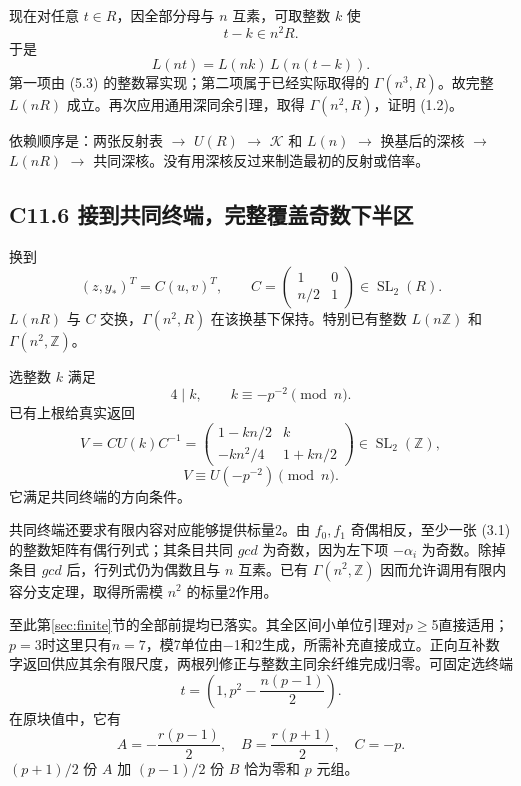 \documentclass[11pt,a4paper]{article}
\theoremstyle{definition}
\numberwithin{equation}{section}
\begin{document}
{现在对任意} \(t\in R\){，因全部分母与} \(n\) {互素，可取整数} \(k\) {使} \[
t-k\in n^2R.
\] {于是} \[
L(nt)=L(nk)\,L(n(t-k)).
\] {第一项由} {(5.3)} {的整数幂实现；第二项属于已经实际取得的} \(\Gamma(n^3,R)\){。故完整} \(L(nR)\) {成立。再次应用通用深同余引理，取得} \(\Gamma(n^2,R)\){，证明} {(1.2)。}

{依赖顺序是：两张反射表} {\ensuremath{\to}} \(U(R)\) {\ensuremath{\to}} \(\mathcal K\) {和} \(L(n)\) {\ensuremath{\to}} {换基后的深核} {\ensuremath{\to}} \(L(nR)\) {\ensuremath{\to}} {共同深核。没有用深核反过来制造最初的反射或倍率。}

\subsection*{\texorpdfstring{{C11.6} {接到共同终端，完整覆盖奇数下半区}}{C11.6 接到共同终端，完整覆盖奇数下半区}}\label{C11-h83}

{换到} \[
(z,y_*)^T=C(u,v)^T,\qquad
C=\begin{pmatrix}1&0\\n/2&1\end{pmatrix}\in\operatorname{SL}_2(R).
\] \(L(nR)\) {与} \(C\) {交换，}\(\Gamma(n^2,R)\) {在该换基下保持。特别已有整数} \(L(n\mathbb Z)\) {和} \(\Gamma(n^2,\mathbb Z)\){。}

{选整数} \(k\) {满足} \[
4\mid k,\qquad k\equiv-p^{-2}\pmod n.
\] {已有上根给真实返回} \[
V=CU(k)C^{-1}
=\begin{pmatrix}
1-kn/2&k\\-kn^2/4&1+kn/2
\end{pmatrix}\in\operatorname{SL}_2(\mathbb Z),
\] \[
V\equiv U(-p^{-2})\pmod n.
\tag{C11.6.1}
\] {它满足共同终端的方向条件。}

{共同终端还要求有限内容对应能够提供标量2。由} \(f_0,f_1\) {奇偶相反，至少一张} {(3.1)} {的整数矩阵有偶行列式；其条目共同} {\ensuremath{gcd}} {为奇数，因为左下项} \(-\alpha_i\) {为奇数。除掉条目} {\ensuremath{gcd}} {后，行列式仍为偶数且与} \(n\) {互素。已有} \(\Gamma(n^2,\mathbb Z)\) {因而允许调用有限内容分支定理，取得所需模} \(n^2\) {的标量2作用。}

{至此}第\ref{sec:finite}节{的全部前提均已落实。其全区间小单位引理对\ensuremath{p}\ensuremath{\ge}5直接适用；\ensuremath{p=3}时这里只有\ensuremath{n=7}，模7单位由−1和2生成，所需补充直接成立。正向互补数字返回供应其余有限尺度，两根列修正与整数主同余纤维完成归零。可固定选终端} \[
t=\left(1,p^2-\frac{n(p-1)}2\right).
\] {在原块值中，它有} \[
A=-\frac{r(p-1)}2,\quad B=\frac{r(p+1)}2,\quad C=-p.
\] \((p+1)/2\) {份} \(A\) {加} \((p-1)/2\) {份} \(B\) {恰为零和} \(p\) {元组。}
\end{document}
